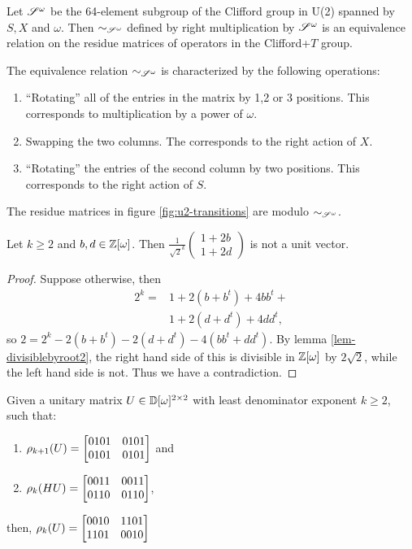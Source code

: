 \begin{definition}
  Let ${\mathscr{S}^\omega}$ be the 64-element subgroup of the Clifford group in U(2) spanned by $S, X$ and
  $\omega$. Then $\sim_{\mathscr{S}^\omega}$ defined by right multiplication by ${\mathscr{S}^\omega}$ is an equivalence relation on
  the residue matrices of operators in the Clifford+$T$ group.
\end{definition}
\begin{remark}
  The equivalence relation $\sim_{\mathscr{S}^\omega}$ is characterized by the following operations:
  \begin{enumerate}
    \item ``Rotating'' all of the entries in the matrix by 1,2 or 3 positions. This corresponds to
      multiplication by a power of $\omega$.
    \item Swapping the two columns. The corresponds to the right action of $X$.
    \item ``Rotating'' the entries of the second column by two positions. This corresponds to the
      right action of $S$.
  \end{enumerate}
\end{remark}
\begin{remark}
  The residue matrices in figure \vref{fig:u2-transitions} are modulo $\sim_{\mathscr{S}^\omega}$.
\end{remark}
\begin{lemma}\label{lem-columncannotbe1s}
  Let $k\ge2$ and $b,d \in \mathbb{Z}[\omega]$. Then $\frac{1}{\sqrt{2}^k}\begin{pmatrix}1+2b\\1+2d\end{pmatrix}$
  is not a unit vector.
\end{lemma}
\begin{proof}
  Suppose otherwise, then
  \begin{align*}
    2^k = &1+2(b+b^t) +4bb^t +\\
          &1+2(d+d^t) +4dd^t,
  \end{align*}
  so $2 = 2^k - 2(b+b^t) - 2(d+d^t) - 4(bb^t + dd^t)$. By lemma \vref{lem-divisiblebyroot2}, the
  right hand side of this is divisible in $\mathbb{Z}[\omega]$ by $2 \sqrt{2}$, while the left hand side is not.
  Thus we have a contradiction.
\end{proof}
\begin{lemma}\label{lem-reduction}
  Given a unitary matrix $U \in \mathbb{D}[\omega]^{2\times2}$ with least denominator exponent $k\ge2$, such that:
  \begin{enumerate}
    \item $\rho_{k+1}(U) = \begin{bmatrix}0101&0101\\0101&0101\end{bmatrix}$ and
    \item $\rho_k(H U) = \begin{bmatrix}0011&0011\\0110&0110\end{bmatrix}$,
  \end{enumerate}
  then, $\rho_k(U) = \begin{bmatrix}0010&1101\\1101&0010\end{bmatrix}$
\end{lemma}
